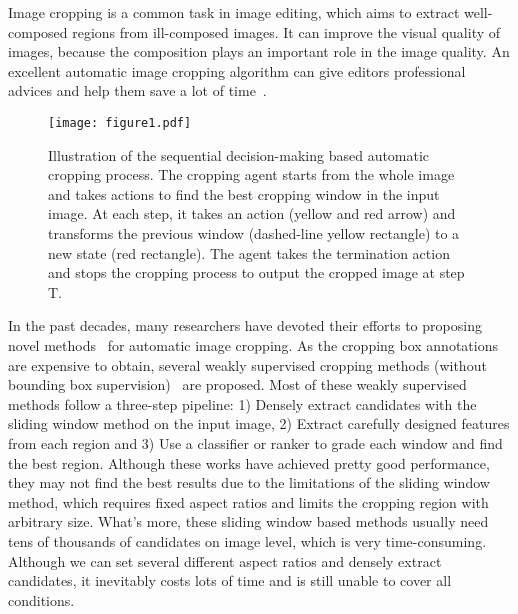 \documentclass[10pt,twocolumn,letterpaper]{article}
\begin{document}
Image cropping is a common task in image editing, which aims to extract well-composed regions from ill-composed images. It can improve the visual quality of images, because the composition plays an important role in the image quality. An excellent automatic image cropping algorithm can give editors professional advices and help them save a lot of time~\cite{kao2017automatic}.
\begin{figure}
\begin{center}
\texttt{[image: figure1.pdf]}
\caption{Illustration of the sequential decision-making based automatic cropping process. The cropping agent starts from the whole image and takes actions to find the best cropping window in the input image. At each step, it takes an action (yellow and red arrow) and transforms the previous window (dashed-line yellow rectangle) to a new state (red rectangle). The agent takes the termination action and stops the cropping process to output the cropped image at step T.}
\end{center}
\label{fig:1}
\end{figure}

In the past decades, many researchers have devoted their efforts to proposing novel methods~\cite{yan2013learning,esmaeili2016fast,hongcnn} for automatic image cropping. As the cropping box annotations are expensive to obtain, several weakly supervised cropping methods (without bounding box supervision)~\cite{fang2014automatic,chen-acmmm-2017,zhang2014weakly} are proposed. Most of these weakly supervised methods follow a three-step pipeline: 1) Densely extract candidates with the sliding window method on the input image, 2) Extract carefully designed features from each region and 3) Use a classifier or ranker to grade each window and find the best region. Although these works have achieved pretty good performance, they may not find the best results due to the limitations of the sliding window method, which requires fixed aspect ratios and limits the cropping region with arbitrary size. What's more, these sliding window based methods usually need tens of thousands of candidates on image level, which is very time-consuming. Although we can set several different aspect ratios and densely extract candidates, it inevitably costs lots of time and is still unable to cover all conditions.
\end{document}
